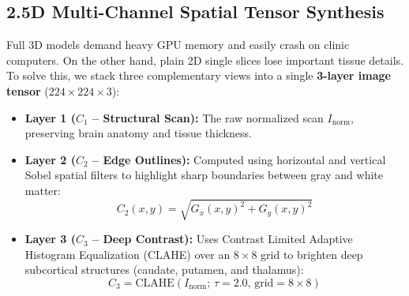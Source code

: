 \documentclass[conference]{IEEEtran}
\begin{document}
\subsection{2.5D Multi-Channel Spatial Tensor Synthesis}
Full 3D models demand heavy GPU memory and easily crash on clinic computers. On the other hand, plain 2D single slices lose important tissue details. To solve this, we stack three complementary views into a single \textbf{3-layer image tensor} ($224 \times 224 \times 3$):
\begin{itemize}
    \item \textbf{Layer 1 ($C_1$ – Structural Scan):} The raw normalized scan $I_{\text{norm}}$, preserving brain anatomy and tissue thickness.
    \item \textbf{Layer 2 ($C_2$ – Edge Outlines):} Computed using horizontal and vertical Sobel spatial filters to highlight sharp boundaries between gray and white matter:
    \begin{equation}
    C_2(x, y) = \sqrt{G_x(x, y)^2 + G_y(x, y)^2} \tag{4}
    \end{equation}
    \item \textbf{Layer 3 ($C_3$ – Deep Contrast):} Uses Contrast Limited Adaptive Histogram Equalization (CLAHE) over an $8 \times 8$ grid to brighten deep subcortical structures (caudate, putamen, and thalamus):
    \begin{equation}
    C_3 = \text{CLAHE}(I_{\text{norm}}; \, \tau = 2.0, \, \text{grid} = 8 \times 8) \tag{5}
    \end{equation}
\end{itemize}
\end{document}

